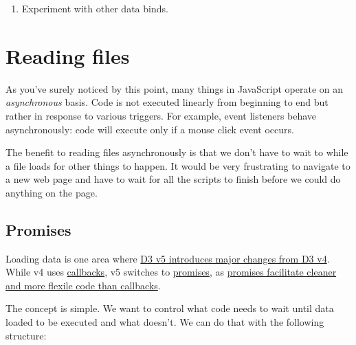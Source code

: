 \documentclass[
  openany]{book}
\providecommand{\tightlist}{%
  \setlength{\itemsep}{0pt}\setlength{\parskip}{0pt}}
\begin{document}
\begin{enumerate}
\def\labelenumi{\arabic{enumi}.}
\setcounter{enumi}{2}
\tightlist
\item
  Experiment with other data binds.
\end{enumerate}

\hypertarget{reading-files}{%
\chapter{\texorpdfstring{Reading files }{Reading files }}\label{reading-files}}

As you've surely noticed by this point, many things in JavaScript operate on an \emph{asynchronous} basis. Code is not executed linearly from beginning to end but rather in response to various triggers. For example, event listeners behave asynchronously: code will execute only if a mouse click event occurs.

The benefit to reading files asynchronously is that we don't have to wait to while a file loads for other things to happen. It would be very frustrating to navigate to a new web page and have to wait for all the scripts to finish before we could do anything on the page.

\hypertarget{promises}{%
\section{Promises}\label{promises}}

Loading data is one area where \href{https://github.com/d3/d3/blob/master/CHANGES.md}{D3 v5 introduces major changes from D3 v4}. While v4 uses \href{https://javascript.info/callbacks}{callbacks}, v5 switches to \href{https://javascript.info/promise-basics}{promises}, as \href{https://hiddentao.com/archives/2014/04/21/why-promises-are-more-flexible-than-callbacks}{promises facilitate cleaner and more flexile code than callbacks}.

The concept is simple. We want to control what code needs to wait until data loaded to be executed and what doesn't. We can do that with the following structure:
\end{document}
